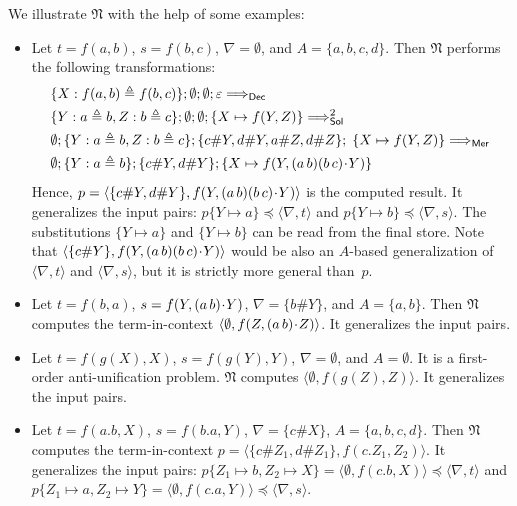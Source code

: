 \documentclass{llncs}
\newcommand{\Lra}{\Longrightarrow}
\newcommand{\frN}{\mathfrak N}
\newcommand{\swap}[2]{\ensuremath{(#1\, #2)}}
\newcommand{\permap}{{\mkern 1mu\cdot \mkern 1mu}}
\newcommand{\ids}{\varepsilon}
\newcommand{\np}[2]{\langle #1, \allowbreak #2\rangle}
\newcommand{\Atoms}{A}
\newcommand{\nablai}{{\nabla}}
\begin{document}
\begin{example}\label{exmp:nau}
We illustrate $\frN$ with the help of some examples:
\begin{itemize}
\item Let $ t=f(a,b)$, $ s=f(b,c)$, $ \nablai =\emptyset$, and
$\Atoms=\{a,b,c,d\}$. Then $\frN$ performs the following
transformations:
  \begin{alignat*}{3}
  &\{ X: f(a,b) \triangleq f(b,c) \};  \emptyset;\emptyset; \ids \Lra_{\mathsf{Dec}}{} \\
  & \{ { Y: a \triangleq b, Z: b \triangleq  c }\};   \emptyset;\emptyset;\{ { X \mapsto f(Y,Z )}\} \Lra^2_{\mathsf{Sol}}{} \\
  & \emptyset;  \{ { Y: a \triangleq  b, Z: b \triangleq  c }\}; \{{ c\# Y, d\#Y, a\# Z, d\# Z}\};\; \{ X \mapsto f(Y,Z)\} \Lra_{\mathsf{Mer}}{} \\
  & \emptyset; \{ { Y: a \triangleq b}\};  \{{ c\# Y, d\# Y}\};\{ { X \mapsto f(Y,\swap{a}{b}\swap{b}{c}\permap Y)}\}
\end{alignat*}
%
Hence, $p=\np{\{c\# Y, d\#Y \}}{f(Y,\swap{a}{b}\swap{b}{c}\permap Y)}$ is the
computed result. It generalizes the input pairs: $p\{ Y \mapsto a\} \preceq
\np{\nablai}{t} $ and $p\{Y \mapsto
  b\} \preceq \np{\nablai}{s}$. The substitutions $\{ Y \mapsto a\}$ and $\{Y \mapsto
  b\}$ can be read from
the final store. Note that $\np{\{c\# Y\}}{f(Y,\swap{a}{b}\swap{b}{c}\permap
  Y)}$ would be also an $\Atoms$-based generalization of
$\np{\nablai}{t}$ and $\np{\nablai}{s}$, but it is strictly more
general than~$p$.

\item
Let $ t=f(b,a)$, $ s=f(Y,\swap{a}{b}\permap Y)$, $ \nablai =\{b\# Y\}$, and
$\Atoms=\{a,b\}$. Then $\frN$ computes the term-in-context
$\np{\emptyset}{f(Z,\swap{a}{b}\permap Z)}$. It generalizes the input
pairs.


\item
Let $ t=f(g(X),X)$, $ s=f(g(Y),Y)$, $ \nablai =\emptyset$, and
$\Atoms=\emptyset$. It is a first-order anti-unification problem. $\frN$ computes
$\np{\emptyset}{f(g(Z),Z)}$. It generalizes the input pairs.





\item
Let $ t = f(a.b,X)$, $ s= f(b.a,Y)$, $ \nablai =\{c\# X\}$,
$\Atoms=\{a,b,c,d\}$. Then $\frN$ computes the term-in-context
$p=\np{\{c\# Z_1,d\#Z_1\}}{f(c.Z_1,Z_2)}$. It generalizes the input
pairs: $p\{Z_1\mapsto b,Z_2\mapsto X\}=\np{\emptyset}{f(c.b,X)}\preceq \np{\nablai}{t}$ and
  $p\{Z_1\mapsto a,Z_2\mapsto Y\} =\np{\emptyset}{f(c.a,Y)}\preceq \np{\nablai}{s}$.  

\end{itemize}
\end{example}
\end{document}
